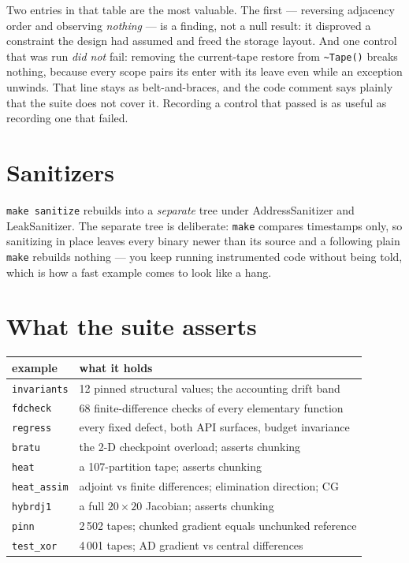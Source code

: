 \documentclass[11pt,a4paper]{report}
\newcommand{\code}[1]{\texttt{#1}}
\begin{document}
\noindent
Two entries in that table are the most valuable. The first --- reversing
adjacency order and observing \emph{nothing} --- is a finding, not a null
result: it disproved a constraint the design had assumed and freed the storage
layout. And one control that was run \emph{did not} fail: removing the
current-tape restore from \code{\textasciitilde Tape()} breaks nothing, because
every scope pairs its enter with its leave even while an exception unwinds. That
line stays as belt-and-braces, and the code comment says plainly that the suite
does not cover it. Recording a control that passed is as useful as recording one
that failed.

\section{Sanitizers}

\code{make sanitize} rebuilds into a \emph{separate} tree under AddressSanitizer
and LeakSanitizer. The separate tree is deliberate: \code{make} compares
timestamps only, so sanitizing in place leaves every binary newer than its
source and a following plain \code{make} rebuilds nothing --- you keep running
instrumented code without being told, which is how a fast example comes to look
like a hang.

\section{What the suite asserts}

\begin{center}
\begin{tabular}{@{}lp{9.2cm}@{}}
\toprule
example & what it holds \\
\midrule
\code{invariants} & 12 pinned structural values; the accounting drift band \\
\code{fdcheck}    & 68 finite-difference checks of every elementary function \\
\code{regress}    & every fixed defect, both API surfaces, budget invariance \\
\code{bratu}      & the 2-D checkpoint overload; asserts chunking \\
\code{heat}       & a 107-partition tape; asserts chunking \\
\code{heat\_assim}& adjoint vs finite differences; elimination direction; CG \\
\code{hybrdj1}    & a full $20\times20$ Jacobian; asserts chunking \\
\code{pinn}       & 2\,502 tapes; chunked gradient equals unchunked reference \\
\code{test\_xor}  & 4\,001 tapes; AD gradient vs central differences \\
\bottomrule
\end{tabular}
\end{center}
\end{document}
